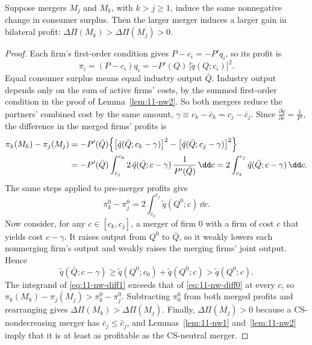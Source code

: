 \begin{lemma}\label{lem:11-nw3}
Suppose mergers $M_j$ and $M_k$, with $k > j \ge 1$, induce the same nonnegative change in consumer surplus. Then the
larger merger induces a larger gain in bilateral profit: $\Delta\Pi(M_k) > \Delta\Pi(M_j) > 0$.
\end{lemma}

\begin{proof}
Each firm's first-order condition gives $P - c_i = -P' q_i$, so its profit is
\begin{equation}\label{eq:11-nw-profit}
\pi_i = (P - c_i)q_i = -P'(Q)\,\big[\tilde q(Q; c_i)\big]^2 .
\end{equation}
Equal consumer surplus means equal industry output $\bar Q$. Industry output depends only on the sum of active
firms' costs, by the summed first-order condition in the proof of Lemma~\ref{lem:11-nw2}. So both mergers reduce the
partners' combined cost by the same amount, $\gamma \equiv c_k - \bar c_k = c_j - \bar c_j$. Since $\frac{\partial\tilde
q}{\partial c} = \frac{1}{P'}$, the difference in the merged firms' profits is
\begin{align}
\pi_k(M_k) - \pi_j(M_j)
&= -P'(\bar Q)\Big\{\big[\tilde q(\bar Q; c_k - \gamma)\big]^2 - \big[\tilde q(\bar Q; c_j - \gamma)\big]^2\Big\}
\notag\\
&= -P'(\bar Q)\int_{c_j}^{c_k} 2\,\tilde q(\bar Q; c - \gamma)\,\frac{1}{P'(\bar Q)}\,\dd c
= 2\int_{c_k}^{c_j}\tilde q(\bar Q; c - \gamma)\,\dd c . \label{eq:11-nw-diff1}
\end{align}
The same steps applied to pre-merger profits give
\begin{equation}\label{eq:11-nw-diff0}
\pi_k^0 - \pi_j^0 = 2\int_{c_k}^{c_j}\tilde q(Q^0; c)\,\dd c .
\end{equation}
Now consider, for any $c \in [c_k, c_j]$, a merger of firm 0 with a firm of cost $c$ that yields cost $c - \gamma$.
It raises output from $Q^0$ to $\bar Q$, so it weakly lowers each nonmerging firm's output and weakly raises the merging
firms' joint output. Hence
\begin{equation*}
\tilde q(\bar Q; c - \gamma) \ge \tilde q(Q^0; c_0) + \tilde q(Q^0; c) > \tilde q(Q^0; c).
\end{equation*}
The integrand of \eqref{eq:11-nw-diff1} exceeds that of \eqref{eq:11-nw-diff0} at every $c$, so
$\pi_k(M_k) - \pi_j(M_j) > \pi_k^0 - \pi_j^0$. Subtracting $\pi_0^0$ from both merged profits and rearranging gives
$\Delta\Pi(M_k) > \Delta\Pi(M_j)$. Finally, $\Delta\Pi(M_j) > 0$ because a CS-nondecreasing merger has $\bar c_j \le
\hat c_j$, and Lemmas~\ref{lem:11-nw1} and~\ref{lem:11-nw2} imply that it is at least as profitable as the CS-neutral
merger.
\end{proof}

